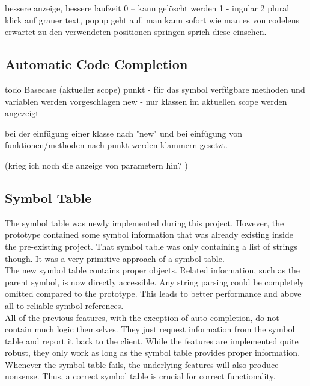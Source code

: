 bessere anzeige, bessere laufzeit
0 -- kann gelöscht werden
1 - ingular
2 plural
 klick auf grauer text, popup geht auf. man kann sofort wie man es von codelens erwartet zu den verwendeten positionen springen sprich diese einsehen.

\subsection{Automatic Code Completion}
todo
Basecase (aktueller scope)
punkt - für das symbol verfügbare methoden und variablen werden vorgeschlagen
new - nur klassen im aktuellen scope werden angezeigt

bei der einfügung einer klasse nach "new" und bei einfügung von funktionen/methoden nach punkt werden klammern gesetzt.

(krieg ich noch die anzeige von parametern hin? )

\subsection{Symbol Table}
The symbol table was newly implemented during this project.
However, the prototype contained some symbol information that was already existing inside the pre-existing project.
That symbol table was only containing a list of strings though.
It was a very primitive approach of a symbol table.\\

The new symbol table contains proper objects.
Related information, such as the parent symbol, is now directly accessible.
Any string parsing could be completely omitted compared to the prototype.
This leads to better performance and above all to reliable symbol references.\\

All of the previous features, with the exception of auto completion, do not contain much logic themselves.
They just request information from the symbol table and report it back to the client.
While the features are implemented quite robust, they only work as long as the symbol table provides proper information.\\

Whenever the symbol table fails, the underlying features will also produce nonsense.
Thus, a correct symbol table is crucial for correct functionality.\\

